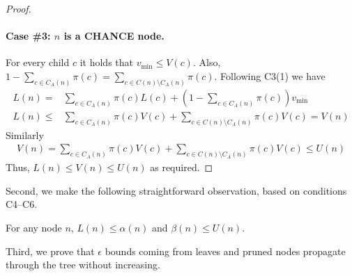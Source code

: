 \documentclass[runningheads]{llncs}
\newcommand{\MM}{\mathit{V}}
\newcommand{\pess}{\mathit{L}}
\newcommand{\opti}{\mathit{U}}
\newcommand{\vmax}{v_{\text{max}}}
\newcommand{\vmin}{v_{\text{min}}}
\begin{document}
\begin{proof}
\paragraph{Case \#3: $n$ is a CHANCE node.}
For every child $c$ it holds that $\vmin\leq \MM(c)$. 
Also, $1-\sum_{c\in C_A(n)} \pi(c) = \sum_{c\in C(n) \setminus C_A(n)} \pi(c)$. Following C3(1) we have
\begin{align}
 \pess(n) = & \!\sum_{c\in C_A(n)\!\!\!\!\!} \!\!\!\pi(c) \pess(c)+ (1-\!\!\!\sum_{c\in C_A(n)\!\!\!\!\!}\!\! \pi(c)) \vmin \\
 \pess(n) \leq & \!\sum_{c\in C_A(n)\!\!\!\!\!} \!\!\!\pi(c) \MM(c)+ \!\!\!\!\sum_{c\in C(n) \setminus C_A(n)\!\!\!\!\!\!\!\!\!\!\!\!}\!\!\!\!\!\pi(c) \MM(c) = V(n)
\end{align}
Similarly
\begin{align}
 \MM(n) = \!\sum_{c\in C_A(n)\!\!\!\!\!} \!\!\!\pi(c) \MM(c)+ \!\!\!\!\sum_{c\in C(n) \setminus C_A(n)\!\!\!\!\!\!\!\!\!\!\!\!}\!\!\!\!\!\pi(c) \MM(c) \leq \opti(n)
\end{align}
Thus, $\pess(n) \leq \MM(n) \leq \opti(n)$ as required.
\end{proof}

Second, we make the following straightforward observation, based on conditions C4--C6.

\begin{lemma}
For any node $n$, $\pess(n) \!\leq\! \alpha(n)$ and $\beta(n) \leq \opti(n)$.
\label{lem:alpha-beta-between-l-u}
\end{lemma}

Third, we prove that $\epsilon$ bounds coming from leaves and pruned nodes propagate through the tree without increasing.
\end{document}
